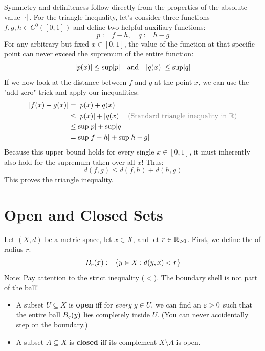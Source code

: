 \begin{solution}
Symmetry and definiteness follow directly from the properties of the absolute value $\lvert\cdot\rvert$. For the triangle inequality, let's consider three functions $f, g, h \in C^0([0,1])$ and define two helpful auxiliary functions:
\[ p := f - h, \quad q := h - g \]
For any arbitrary but fixed $x \in [0,1]$, the value of the function at that specific point can never exceed the supremum of the entire function:
\[ \lvert p(x)\rvert \le \sup \lvert p\rvert \quad \text{and} \quad \lvert q(x)\rvert \le \sup \lvert q\rvert \]
If we now look at the distance between $f$ and $g$ at the point $x$, we can use the "add zero" trick and apply our inequalities:
\begin{equation}
    \begin{aligned}
        \abs{f(x) - g(x)} &= \abs{p(x) + q(x)} \\
        &\le \abs{p(x)} + \abs{q(x)} \quad \text{\textcolor{eGray}{(Standard triangle inequality in $\R$)}} \\
        &\le \sup \abs{p} + \sup \abs{q} \\
        &= \sup \abs{f - h} + \sup \abs{h - g}
    \end{aligned}
\end{equation}
Because this upper bound holds for \textcolor{eSaddleBrown}{every single} $x \in [0,1]$, it must inherently also hold for the supremum taken over all $x$! Thus:
\[ d(f,g) \le d(f,h) + d(h,g) \]
This proves the triangle inequality.
\end{solution}

\hrulefill

\section{Open and Closed Sets}

Let $(X, d)$ be a metric space, let $x \in X$, and let $r \in \mathbb{R}_{>0}$. First, we define the \textcolor{eSaddleBrown}{} of radius $r$:
\[ B_r(x) := \left\{  y \in X : d(y,x) < r  \right\} \]
\textcolor{eGray}{Note: Pay attention to the strict inequality ($<$). The boundary shell is not part of the ball!}

\begin{definition*}
\begin{itemize}
    \item A subset $U \subseteq X$ is \textcolor{eDarkGreen}{\textbf{open}} iff for \emph{every} $y \in U$, we can find an $\varepsilon > 0$ such that the entire ball $B_\varepsilon(y)$ lies completely inside $U$. \textcolor{eGray}{(You can never accidentally step on the boundary.)}
    \item A subset $A \subseteq X$ is \textcolor{eDarkRed}{\textbf{closed}} iff its complement $X \setminus A$ is open.
\end{itemize}
\end{definition*}

